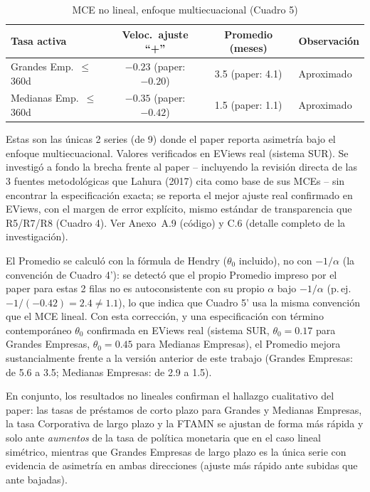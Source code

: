 \documentclass[12pt, letterpaper]{article}
\begin{document}
\begin{table}[ht]
\renewcommand{\thetable}{5'}
\begin{threeparttable}
\caption{MCE no lineal, enfoque multiecuacional (Cuadro 5)}
\label{tab:cuadro5nl}
\small
\begin{tabular}{lccl}
\toprule
Tasa activa & Veloc.\ ajuste ``+'' & Promedio (meses) & Observación\\
\midrule
Grandes Emp.\ $\le$360d  & $-0.23$ (paper: $-0.20$) & 3.5\tnote{a} (paper: 4.1) & Aproximado \\
Medianas Emp.\ $\le$360d & $-0.35$ (paper: $-0.42$) & 1.5\tnote{a} (paper: 1.1) & Aproximado \\
\bottomrule
\end{tabular}
\begin{tablenotes}[flushleft]
\footnotesize\item
Estas son las únicas 2 series (de 9) donde el paper reporta asimetría
bajo el enfoque multiecuacional. Valores verificados en EViews real
(sistema SUR). Se investigó a fondo la brecha frente al paper --
incluyendo la revisión directa de las 3 fuentes metodológicas que
Lahura (2017) cita como base de sus MCEs
\parencite{heffernan1997,sander2004,hofmann2004} -- sin encontrar la
especificación exacta; se reporta el mejor ajuste real confirmado en
EViews, con el margen de error explícito, mismo estándar de
transparencia que R5/R7/R8 (Cuadro 4). Ver Anexo~A.9 (código) y C.6
(detalle completo de la investigación).
\item[a] El Promedio se calculó con la fórmula de Hendry
\parencite{hendry1995} ($\theta_0$ incluido), no con $-1/\alpha$ (la
convención de Cuadro 4'): se detectó que el propio Promedio impreso
por el paper para estas 2 filas no es autoconsistente con su propio
$\alpha$ bajo $-1/\alpha$ (p.\,ej. $-1/(-0.42)=2.4\neq 1.1$), lo que
indica que Cuadro 5' usa la misma convención que el MCE lineal. Con
esta corrección, y una especificación con término contemporáneo
$\theta_0$ confirmada en EViews real (sistema SUR,
$\theta_0=0.17$ para Grandes Empresas, $\theta_0=0.45$ para Medianas
Empresas), el Promedio mejora sustancialmente frente a la versión
anterior de este trabajo (Grandes Empresas: de 5.6 a 3.5; Medianas
Empresas: de 2.9 a 1.5).
\end{tablenotes}
\end{threeparttable}
\end{table}

En conjunto, los resultados no lineales confirman el hallazgo
cualitativo del paper: las tasas de préstamos de corto plazo para
Grandes y Medianas Empresas, la tasa Corporativa de largo plazo y la
FTAMN se ajustan de forma más rápida y solo ante \textit{aumentos} de
la tasa de política monetaria que en el caso lineal simétrico, mientras
que Grandes Empresas de largo plazo es la única serie con evidencia de
asimetría en ambas direcciones (ajuste más rápido ante subidas que ante
bajadas).
\end{document}
